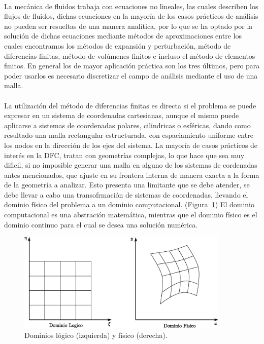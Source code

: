 \documentclass[letterpaper, openright, 12pt]{book}
\begin{document}
    \paragraph*{}
    La mecánica de fluidos trabaja con ecuaciones no lineales, las cuales
    describen los flujos de fluidos, dichas ecuaciones en la mayoría de los
    casos prácticos de análisis no pueden ser resueltas de una manera
    analítica, por lo que se ha optado por la solución de dichas ecuaciones
    mediante métodos de aproximaciones entre los cuales encontramos los métodos
    de expansión y perturbación, método de diferencias finitas, método de
    volúmenes finitos e incluso el método de elementos finitos. En general los
    de mayor aplicación práctica son los tres últimos, pero para poder usarlos
    es necesario discretizar el campo de análisis mediante el uso de una
    malla.\cite{thompsonhandbook}

    \paragraph*{}
    La utilización del método de diferencias finitas es directa si el problema
    se puede expresar en un sistema de coordenadas cartesianas, aunque el
    mismo puede aplicarse a sistemas de coordenadas polares, cilindricas o
    esféricas, dando como resultado una malla rectangular estructurada, con
    espaciamiento uniforme entre los nodos en la dirección de los ejes del
    sistema. La mayoría de casos prácticos de interés en la DFC, tratan con
    geometrías complejas, lo que hace que sea muy dificil, si no imposible
    generar una malla en alguno de los sistemas de cordenadas antes
    mencionados, que ajuste en su frontera interna de manera exacta a la
    forma de la geometría a analizar. Esto presenta una limitante que se debe
    atender, se debe llevar a cabo una transofrmación de sistemas de
    coordenadas, llevando el dominio físico del problema a un dominio
    computacional. (Figura~\ref{fig:dominios}) El dominio computacional es
    una abstración matemática, mientras que el dominio físico es el dominio
    continuo para el cual se desea una solución numérica.
    \begin{figure}[htbp!]
        \centering
        \includegraphics[keepaspectratio, width=0.9\textwidth]{./img/dominios}
        \caption[Dominios lógico y físico]{Dominios lógico (izquierda) y
        físico (derecha). \cite{numerical-grid}}
        \label{fig:dominios}
    \end{figure}
\end{document}
